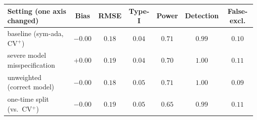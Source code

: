 \documentclass[border=8pt]{standalone}
\begin{document}
\renewcommand{\arraystretch}{1.35}\large\begin{tabular}{lcccccc}
\toprule
Setting (one axis changed) & Bias & RMSE & Type-I & Power & Detection & False-excl.\\
\midrule
baseline (sym-ada, CV$^+$) & $-0.00$ & $0.18$ & $0.04$ & $0.71$ & $0.99$ & $0.10$\\
severe model misspecification & $+0.00$ & $0.19$ & $0.04$ & $0.70$ & $1.00$ & $0.11$\\
unweighted (correct model) & $-0.00$ & $0.18$ & $0.05$ & $0.71$ & $1.00$ & $0.09$\\
one-time split (vs.\ CV$^+$) & $-0.00$ & $0.19$ & $0.05$ & $0.65$ & $0.99$ & $0.11$\\
\bottomrule
\end{tabular}
\end{document}
